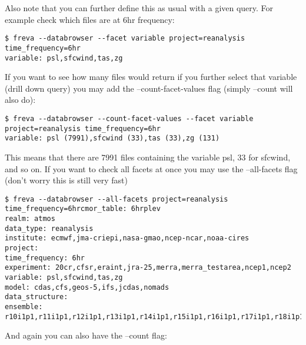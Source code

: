\documentclass[a4paper,11pt]{ltxdoc}
\begin{document}
Also note that you can further define this as usual with a given query. For example check which files are at 6hr frequency:
\begin{lstlisting}
$ freva --databrowser --facet variable project=reanalysis time_frequency=6hr
variable: psl,sfcwind,tas,zg
\end{lstlisting}
If you want to see how many files would return if you further select that variable (drill down query) you may add the --count-facet-values flag (simply --count will also do):
\begin{lstlisting}
$ freva --databrowser --count-facet-values --facet variable project=reanalysis time_frequency=6hr
variable: psl (7991),sfcwind (33),tas (33),zg (131)
\end{lstlisting}
This means that there are 7991 files containing the variable psl, 33 for sfcwind, and so on.
If you want to check all facets at once you may use the --all-facets flag (don't worry this is still very fast)
\begin{lstlisting}
$ freva --databrowser --all-facets project=reanalysis 
time_frequency=6hrcmor_table: 6hrplev
realm: atmos
data_type: reanalysis
institute: ecmwf,jma-criepi,nasa-gmao,ncep-ncar,noaa-cires
project: 
time_frequency: 6hr
experiment: 20cr,cfsr,eraint,jra-25,merra,merra_testarea,ncep1,ncep2
variable: psl,sfcwind,tas,zg
model: cdas,cfs,geos-5,ifs,jcdas,nomads
data_structure: 
ensemble: r10i1p1,r11i1p1,r12i1p1,r13i1p1,r14i1p1,r15i1p1,r16i1p1,r17i1p1,r18i1p1,r19i1p1,r1i1p1,r20i1p1,r21i1p1,r22i1p1,r23i1p1,r24i1p1,r25i1p1,r26i1p1,r27i1p1,r28i1p1,r29i1p1,r2i1p1,r30i1p1,r31i1p1,r32i1p1,r33i1p1,r34i1p1,r35i1p1,r36i1p1,r37i1p1,r38i1p1,r39i1p1,r3i1p1,r40i1p1,r41i1p1,r42i1p1,r43i1p1,r44i1p1,r45i1p1,r46i1p1,r47i1p1,r48i1p1,r49i1p1,r4i1p1,r50i1p1,r51i1p1,r52i1p1,r53i1p1,r54i1p1,r55i1p1,r56i1p1,r5i1p1,r6i1p1,r7i1p1,r8i1p1,r9i1p1
\end{lstlisting}
And again you can also have the --count flag:
\end{document}
